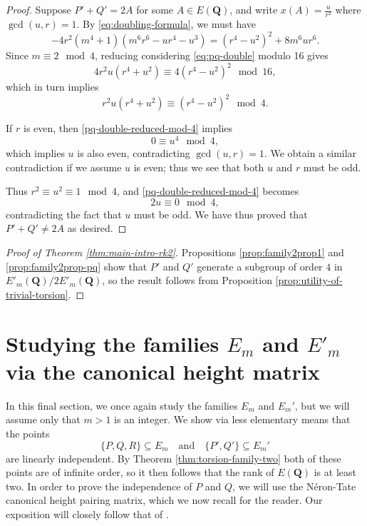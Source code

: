 \documentclass{amsart}
\numberwithin{equation}{section}
\theoremstyle{remark}
\newcommand{\Q}{\mathbf{Q}}
\begin{document}
\begin{proof}
Suppose $P'+Q'=2A$ for some $A\in E(\Q)$, and write $x(A)=\frac{u}{r^2}$ where $\gcd(u,r)=1$. By \eqref{eq:doubling-formula}, we must have
\begin{equation}\label{eq:pq-double}
-4r^2(m^4+1)(m^6r^6 - ur^4 - u^3)
=
(r^4 -u^2)^2+ 8m^6ur^6.
\end{equation}
Since $m \equiv 2 \mod 4$, reducing considering \eqref{eq:pq-double} modulo 16 gives
\[
4r^2u(r^4+u^2)\equiv 4(r^4-u^2)^2 \mod 16,
\]
which in turn implies
\begin{equation}\label{pq-double-reduced-mod-4}
r^2u(r^4+u^2)\equiv (r^4-u^2)^2 \mod 4.
\end{equation}

If $r$ is even, then \eqref{pq-double-reduced-mod-4} implies
\[
0 \equiv u^4 \mod 4,
\]
which implies $u$ is also even, contradicting $\gcd(u,r)=1$. We obtain a similar contradiction if we assume $u$ is even; thus we see that both $u$ and $r$ must be odd.

Thus $r^2 \equiv u^2 \equiv 1 \mod 4$, and \eqref{pq-double-reduced-mod-4} becomes
\[
2u \equiv 0 \mod 4,
\]
contradicting the fact that $u$ must be odd. We have thus proved that $P'+Q' \neq 2A$ as desired.
\end{proof}

\begin{proof}[Proof of Theorem \ref{thm:main-intro-rk2}]
Propositions \ref{prop:family2prop1} and \ref{prop:family2prop-pq} show that $P'$ and $Q'$ generate a subgroup of order $4$ in $E'_m(\Q)/2E'_m(\Q)$, so the result follows from Proposition \ref{prop:utility-of-trivial-torsion}.
\end{proof}

\section{Studying the families $E_m$ and $E'_m$ via the canonical height matrix}\label{sec:height-matrix}

In this final section, we once again study the families $E_m$ and $E_m'$, but we will assume only that $m>1$ is an integer. We show via less elementary means that the points
\[
\{P,Q,R\} \subseteq E_m \quad \text{and} \quad \{P',Q'\} \subseteq E_m'
\]
are linearly independent. By Theorem \ref{thm:torsion-family-two} both of these points are of infinite order, so it then follows that the rank of $E(\Q)$ is at least two. In order to prove the independence of $P$ and $Q$, we will use the N\'{e}ron-Tate canonical height pairing matrix, which we now recall for the reader. Our exposition will closely follow that of \cite[$\S$2.7]{alvaro-book}.
\end{document}
